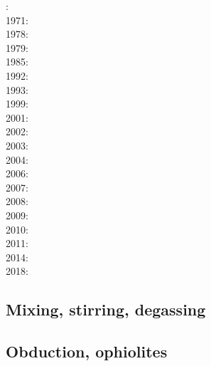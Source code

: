 {\scriptsize
{}: \cite{mcke69}\\
1971: \cite{tomj71}\\
1978: \cite{tosl78}\\
1979: \cite{bobo79}\\
1985: \cite{hond85}\\
1992: \cite{dast92}\\
1993: \cite{furu93}\\
1999: \cite{pewa99}\\
2001: \cite{bigu01}\cite{haki01}\\
2002: \cite{vakp02}\\
2003: \cite{vank03}\\
2004: \cite{enwi04}\\
2006: \cite{gogc06}\cite{gecy06}\\
2007: \cite{gogc07}\cite{knvk07}\cite{lohd07}\\
2008: \cite{knva08}\cite{cage08}\cite{vack08}\\
2009: \cite{leki09}\cite{heaa09}\\
2010: \cite{roms10}\cite{hogz10}\cite{syab06}\\
2011: \cite{zhgh11}\\
2014: \cite{ledg14}\cite{mabv14}\\
2018: \cite{pltv18}
}

\subsection{Mixing, stirring, degassing} 

{\scriptsize
\noindent
\cite{olyb84}
\cite{ketu90}
\cite{pelt96}
\cite{cori99}
\cite{huke01}
\cite{vahb02}
\cite{fasa03}\cite{vabh03}
\cite{colt05}
\cite{gogc07}\cite{nake07}\cite{vabh07}
\cite{lemj11}\cite{saad11}
\cite{onzh18}
}

\subsection{Obduction, ophiolites}
 

